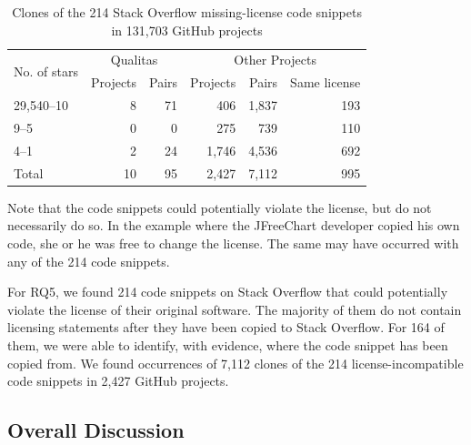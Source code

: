 \documentclass[10pt,journal,compsoc]{IEEEtran}
\newenvironment{boxquote}{\vspace{-1ex}\setlength{\FrameSep}{1\fboxsep}\begin{framed}\setlength{\parskip}{0.5\baselineskip}\setlength{\parindent}{0pt}}{\end{framed}}
\begin{document}
\begin{table}
	\centering
	\label{tab:license_github}
	\begin{tabular}{lrrrrr}
		\toprule
		\multirow{2}{*}{No. of stars} & \multicolumn{2}{c}{Qualitas} & \multicolumn{3}{c}{Other Projects} \\ \cmidrule{2-6}
		& Projects & Pairs & Projects & Pairs & Same license \\
		\midrule
		29,540--10 & 8 & 71 & 406 & 1,837 & 193 \\
		9--5 & 0 & 0 & 275 & 739 & 110 \\
		4--1 & 2 & 24 & 1,746 & 4,536 & 692 \\
		\midrule
		Total & 10 & 95 & 2,427 & 7,112 & 995 \\
		\bottomrule
	\end{tabular}
	\caption{Clones of the 214 Stack Overflow missing-license code snippets in 131,703 GitHub projects}
\end{table}

Note that the code snippets could potentially violate the license, but do
not necessarily do so. In the example where the JFreeChart
developer copied his own code, she or he was free to change the
license. The same may have occurred with any of the 214 code
snippets.

\begin{boxquote}
	For RQ5, we found 214 code snippets on Stack Overflow that
	could potentially violate the license of their original software. The majority of them
	do not contain licensing statements after they have been copied to
	Stack Overflow. For 164 of them, we were able to identify,
	with evidence, where the code snippet has been copied from.
	We found occurrences of 7,112 clones of the 214 license-incompatible code snippets
	in 2,427 GitHub projects.
\end{boxquote}

\subsection{Overall Discussion} %
\end{document}
